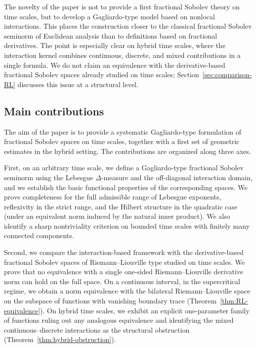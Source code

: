 \documentclass[11pt,a4paper]{article}
\numberwithin{equation}{section}
\theoremstyle{definition}
\begin{document}
The novelty of the paper is not to provide a first fractional Sobolev theory on time scales, but to develop a Gagliardo-type model based on nonlocal interactions. This places the construction closer to the classical fractional Sobolev seminorm of Euclidean analysis than to definitions based on fractional derivatives. The point is especially clear on hybrid time scales, where the interaction kernel combines continuous, discrete, and mixed contributions in a single formula. We do not claim an equivalence with the derivative-based fractional Sobolev spaces already studied on time scales; Section~\ref{sec:comparison-RL} discusses this issue at a structural level.


\subsection*{Main contributions}

The aim of the paper is to provide a systematic Gagliardo-type formulation of fractional Sobolev spaces on time scales, together with a first set of geometric estimates in the hybrid setting. The contributions are organized along three axes.

First, on an arbitrary time scale, we define a Gagliardo-type fractional Sobolev seminorm using the Lebesgue $\Delta$-measure and the off-diagonal interaction domain, and we establish the basic functional properties of the corresponding spaces. We prove completeness for the full admissible range of Lebesgue exponents, reflexivity in the strict range, and the Hilbert structure in the quadratic case (under an equivalent norm induced by the natural inner product). We also identify a sharp nontriviality criterion on bounded time scales with finitely many connected components.

Second, we compare the interaction-based framework with the derivative-based fractional Sobolev spaces of Riemann--Liouville type studied on time scales. We prove that no equivalence with a single one-sided Riemann--Liouville derivative norm can hold on the full space. On a continuous interval, in the supercritical regime, we obtain a norm equivalence with the bilateral Riemann--Liouville space on the subspace of functions with vanishing boundary trace (Theorem~\ref{thm:RL-equivalence}). On hybrid time scales, we exhibit an explicit one-parameter family of functions ruling out any analogous equivalence and identifying the mixed continuous--discrete interactions as the structural obstruction (Theorem~\ref{thm:hybrid-obstruction}).
\end{document}
